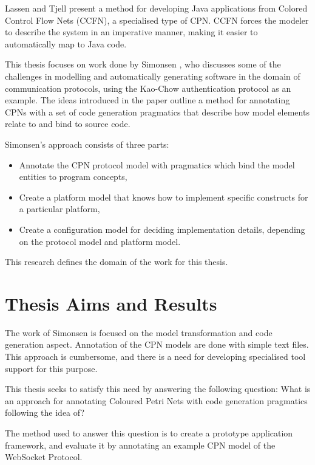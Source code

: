 Lassen and Tjell \cite{lassen2010automatic}  present a method for developing
Java applications from Colored Control Flow Nets (CCFN), a specialised type of
CPN. CCFN forces the modeler to describe the system in an
imperative manner, making it easier to automatically map to Java code.

This thesis focuses on work done by Simonsen \cite{Simonsen2011}, who discusses
some of the challenges in modelling and automatically generating software in the
domain of communication protocols, using the Kao-Chow authentication protocol
as an example.
The ideas introduced in the paper outline a method for annotating CPNs with a
set of code generation pragmatics that describe how model elements relate to and
bind to source code. 

Simonsen's approach consists of three parts: 
\begin{itemize}
	\item Annotate the CPN protocol model with pragmatics which bind the model
	entities to program concepts,
	\item Create a platform	model that knows how to implement specific constructs
	for a particular platform,
	\item Create a configuration model for deciding implementation details,
	depending on the protocol model and platform model.   
\end{itemize}   

This research defines the domain of the work for this thesis.

\section{Thesis Aims and Results}
The work of Simonsen is focused on the model transformation and code generation
aspect. Annotation of the CPN models are done with simple text files. This
approach is cumbersome, and there is a need for developing specialised
tool support for this purpose.

This thesis seeks to satisfy this need by answering the following
question: What is an approach for annotating Coloured Petri Nets with code
generation pragmatics following the idea of?

The method used to answer this question is to create a prototype application
framework, and evaluate it by annotating an example CPN model of the
WebSocket Protocol.


